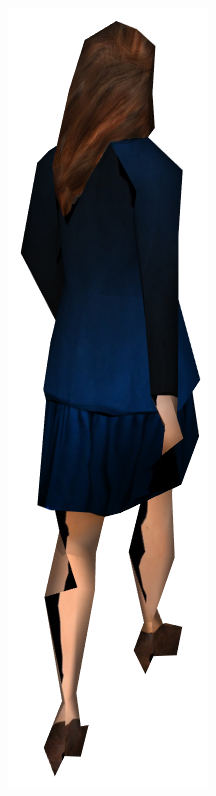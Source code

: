 \begin{figure}[h]
  \centering
  \begin{subfigure}[b]{.2\textwidth}
    \includegraphics[width=\textwidth]{figures/woman_render.png}

\end{subfigure}
\end{figure}
